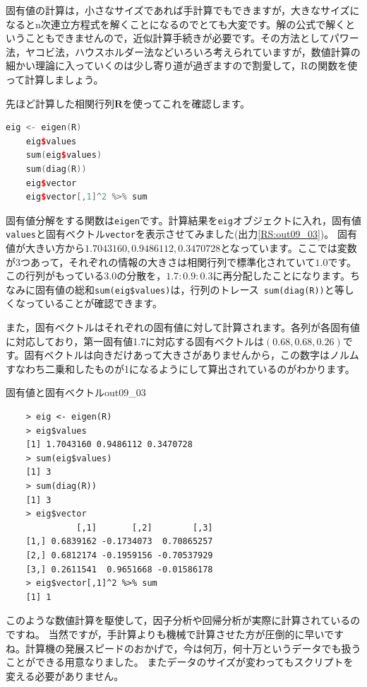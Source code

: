 \documentclass{ltjsbook}
\begin{document}
固有値の計算は，小さなサイズであれば手計算でもできますが，大きなサイズになるとn次連立方程式を解くことになるのでとても大変です。解の公式で解くということもできませんので，近似計算手続きが必要です。その方法としてパワー法，ヤコビ法，ハウスホルダー法などいろいろ考えられていますが，数値計算の細かい理論に入っていくのは少し寄り道が過ぎますので割愛して，Rの関数を使って計算しましょう。

先ほど計算した相関行列$\bm{R}$を使ってこれを確認します。

\begin{lstlisting}[language=c++,label={code::09_06},caption={相関行列の固有値分解}]
    eig <- eigen(R)
    eig$values
    sum(eig$values)
    sum(diag(R))
    eig$vector
    eig$vector[,1]^2 %>% sum
\end{lstlisting}

固有値分解をする関数は\texttt{eigen}です。計算結果を\texttt{eig}オブジェクトに入れ，固有値\verb|values|と固有ベクトル\verb|vector|を表示させてみました(出力\ref{RS:out09_03})。
固有値が大きい方から$1.7043160,0.9486112,0.3470728$となっています。ここでは変数が3つあって，それぞれの情報の大きさは相関行列で標準化されていて$1.0$です。この行列がもっている$3.0$の分散を，$1.7 : 0.9 : 0.3$に再分配したことになります。ちなみに固有値の総和\verb|sum(eig$values)|は，行列のトレース\verb| sum(diag(R))|と等しくなっていることが確認できます。

また，固有ベクトルはそれぞれの固有値に対して計算されます。各列が各固有値に対応しており，第一固有値1.7に対応する固有ベクトルは$(0.68,0.68,0.26)$です。固有ベクトルは向きだけあって大きさがありませんから，この数字はノルムすなわち二乗和したものが1になるようにして算出されているのがわかります。
\begin{Rscreen}{固有値と固有ベクトル}{out09_03}
\begin{verbatim}
    > eig <- eigen(R)
    > eig$values
    [1] 1.7043160 0.9486112 0.3470728
    > sum(eig$values)
    [1] 3
    > sum(diag(R))
    [1] 3
    > eig$vector
              [,1]       [,2]        [,3]
    [1,] 0.6839162 -0.1734073  0.70865257
    [2,] 0.6812174 -0.1959156 -0.70537929
    [3,] 0.2611541  0.9651668 -0.01586178
    > eig$vector[,1]^2 %>% sum
    [1] 1
\end{verbatim}
\end{Rscreen}

このような数値計算を駆使して，因子分析や回帰分析が実際に計算されているのですね。
当然ですが，手計算よりも機械で計算させた方が圧倒的に早いですね。計算機の発展スピードのおかげで，今は何万，何十万というデータでも扱うことができる用意なりました。
またデータのサイズが変わってもスクリプトを変える必要がありません。
\end{document}
